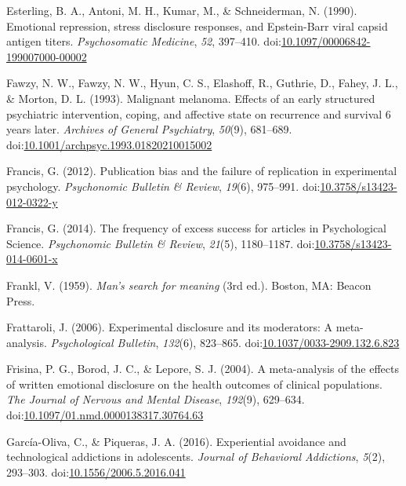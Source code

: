 \documentclass[man]{apa6}
\theoremstyle{definition}
\theoremstyle{definition}
\theoremstyle{definition}
\theoremstyle{remark}
\begin{document}
\hypertarget{ref-Esterling1990}{}
Esterling, B. A., Antoni, M. H., Kumar, M., \& Schneiderman, N. (1990).
Emotional repression, stress disclosure responses, and Epstein-Barr
viral capsid antigen titers. \emph{Psychosomatic Medicine}, \emph{52},
397--410.
doi:\href{https://doi.org/10.1097/00006842-199007000-00002}{10.1097/00006842-199007000-00002}

\hypertarget{ref-Fawzy1993}{}
Fawzy, N. W., Fawzy, N. W., Hyun, C. S., Elashoff, R., Guthrie, D.,
Fahey, J. L., \& Morton, D. L. (1993). Malignant melanoma. Effects of an
early structured psychiatric intervention, coping, and affective state
on recurrence and survival 6 years later. \emph{Archives of General
Psychiatry}, \emph{50}(9), 681--689.
doi:\href{https://doi.org/10.1001/archpsyc.1993.01820210015002}{10.1001/archpsyc.1993.01820210015002}

\hypertarget{ref-Francis2012}{}
Francis, G. (2012). Publication bias and the failure of replication in
experimental psychology. \emph{Psychonomic Bulletin \& Review},
\emph{19}(6), 975--991.
doi:\href{https://doi.org/10.3758/s13423-012-0322-y}{10.3758/s13423-012-0322-y}

\hypertarget{ref-Francis2014}{}
Francis, G. (2014). The frequency of excess success for articles in
Psychological Science. \emph{Psychonomic Bulletin \& Review},
\emph{21}(5), 1180--1187.
doi:\href{https://doi.org/10.3758/s13423-014-0601-x}{10.3758/s13423-014-0601-x}

\hypertarget{ref-Frankl1959}{}
Frankl, V. (1959). \emph{Man's search for meaning} (3rd ed.). Boston,
MA: Beacon Press.

\hypertarget{ref-Frattaroli2006}{}
Frattaroli, J. (2006). Experimental disclosure and its moderators: A
meta-analysis. \emph{Psychological Bulletin}, \emph{132}(6), 823--865.
doi:\href{https://doi.org/10.1037/0033-2909.132.6.823}{10.1037/0033-2909.132.6.823}

\hypertarget{ref-Frisina2004a}{}
Frisina, P. G., Borod, J. C., \& Lepore, S. J. (2004). A meta-analysis
of the effects of written emotional disclosure on the health outcomes of
clinical populations. \emph{The Journal of Nervous and Mental Disease},
\emph{192}(9), 629--634.
doi:\href{https://doi.org/10.1097/01.nmd.0000138317.30764.63}{10.1097/01.nmd.0000138317.30764.63}

\hypertarget{ref-Garcia-Oliva2016}{}
García-Oliva, C., \& Piqueras, J. A. (2016). Experiential avoidance and
technological addictions in adolescents. \emph{Journal of Behavioral
Addictions}, \emph{5}(2), 293--303.
doi:\href{https://doi.org/10.1556/2006.5.2016.041}{10.1556/2006.5.2016.041}
\end{document}
